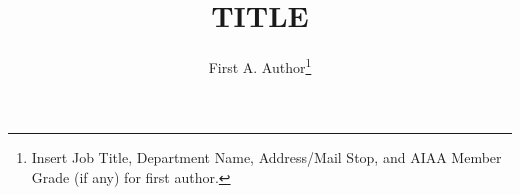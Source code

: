 \documentclass[journal]{new-aiaa}
\title{TITLE}
\author{First A. Author\footnote{Insert Job Title, Department Name, Address/Mail Stop, and AIAA Member Grade (if any) for first author.}}
\affil{Business or Academic Affiliation 1, City, State, Zip Code}
\begin{document}
\maketitle

\begin{abstract}
	
	









	
	
	
		
		
		
		
		
		
		
	
	

\end{abstract}



\end{document}
